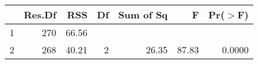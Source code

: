 \begin{table}[ht]
\centering
\begin{tabular}{lrrrrrr}
  \hline
 & Res.Df & RSS & Df & Sum of Sq & F & Pr($>$F) \\ 
  \hline
1 & 270 & 66.56 &  &  &  &  \\ 
  2 & 268 & 40.21 & 2 & 26.35 & 87.83 & 0.0000 \\ 
   \hline
\end{tabular}
\end{table}
